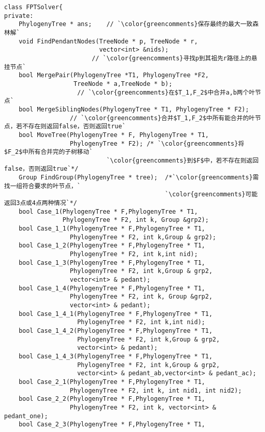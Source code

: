\begin{CJK}{UTF8}{gbsn}
\begin{lstlisting}
class FPTSolver{
private:
    PhylogenyTree * ans;    // `\color{greencomments}保存最终的最大一致森林解`
    void FindPendantNodes(TreeNode * p, TreeNode * r,
                          vector<int> &nids); 
                        // `\color{greencomments}寻找p到其祖先r路径上的悬挂节点`
    bool MergePair(PhylogenyTree *T1, PhylogenyTree *F2,
                   TreeNode * a,TreeNode * b);
                    // `\color{greencomments}在$T_1,F_2$中合并a,b两个叶节点`
    bool MergeSiblingNodes(PhylogenyTree * T1, PhylogenyTree * F2);
                  // `\color{greencomments}合并$T_1,F_2$中所有能合并的叶节点，若不存在则返回false，否则返回true`
    bool MoveTree(PhylogenyTree * F, PhylogenyTree * T1,
                  PhylogenyTree * F2); /* `\color{greencomments}将$F_2$中所有合并完的子树移动`
                            `\color{greencomments}到$F$中，若不存在则返回false，否则返回true`*/
    Group FindGroup(PhylogenyTree * tree);  /*`\color{greencomments}需找一组符合要求的叶节点，`
                                            `\color{greencomments}可能返回3点或4点两种情况`*/
    bool Case_1(PhylogenyTree * F,PhylogenyTree * T1,
                PhylogenyTree * F2, int k, Group &grp2);
    bool Case_1_1(PhylogenyTree * F,PhylogenyTree * T1,
                  PhylogenyTree * F2, int k,Group & grp2);
    bool Case_1_2(PhylogenyTree * F,PhylogenyTree * T1,
                  PhylogenyTree * F2, int k,int nid);
    bool Case_1_3(PhylogenyTree * F,PhylogenyTree * T1,
                  PhylogenyTree * F2, int k,Group & grp2,
                  vector<int> & pedant);
    bool Case_1_4(PhylogenyTree * F,PhylogenyTree * T1,
                  PhylogenyTree * F2, int k, Group &grp2,
                  vector<int> & pedant);
    bool Case_1_4_1(PhylogenyTree * F,PhylogenyTree * T1,
                    PhylogenyTree * F2, int k,int nid);
    bool Case_1_4_2(PhylogenyTree * F,PhylogenyTree * T1,
                    PhylogenyTree * F2, int k,Group & grp2,
                    vector<int> & pedant);
    bool Case_1_4_3(PhylogenyTree * F,PhylogenyTree * T1,
                    PhylogenyTree * F2, int k,Group & grp2,
                    vector<int> & pedant_ab,vector<int> & pedant_ac);
    bool Case_2_1(PhylogenyTree * F,PhylogenyTree * T1,
                  PhylogenyTree * F2, int k, int nid1, int nid2);
    bool Case_2_2(PhylogenyTree * F,PhylogenyTree * T1,
                  PhylogenyTree * F2, int k, vector<int> & pedant_one);
    bool Case_2_3(PhylogenyTree * F,PhylogenyTree * T1,

\end{lstlisting}
\end{CJK}
